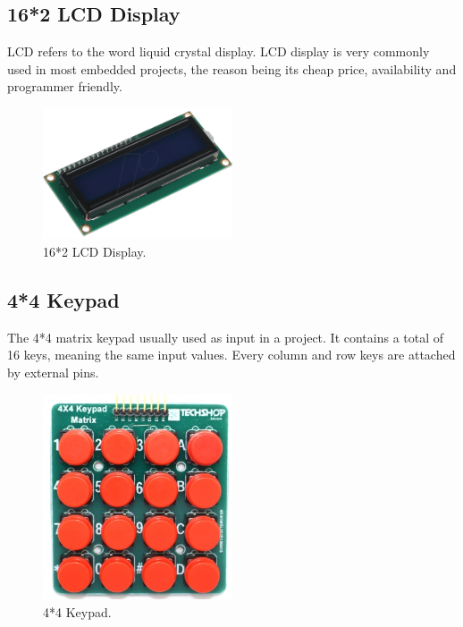 \subsection{16*2 LCD Display}
LCD refers to the word liquid crystal display. LCD display is very commonly used in most embedded projects, the reason being its cheap price, availability and programmer friendly. 
\begin{figure}[H]
\centering
\includegraphics[width=0.5\textwidth]{figures/16x2 LCD.png}
\caption{16*2 LCD Display.}
\label{LCD Display}
\end{figure}
\subsection{4*4 Keypad}
The 4*4 matrix keypad usually used as input in a project. It contains a total of 16 keys, meaning the same input values. Every column and row keys are attached by external pins.
\begin{figure}[H]
\centering
\includegraphics[width=0.5\textwidth]{figures/Keypad.jpg}
\caption{4*4 Keypad.}
\label{Keypad}
\end{figure}
